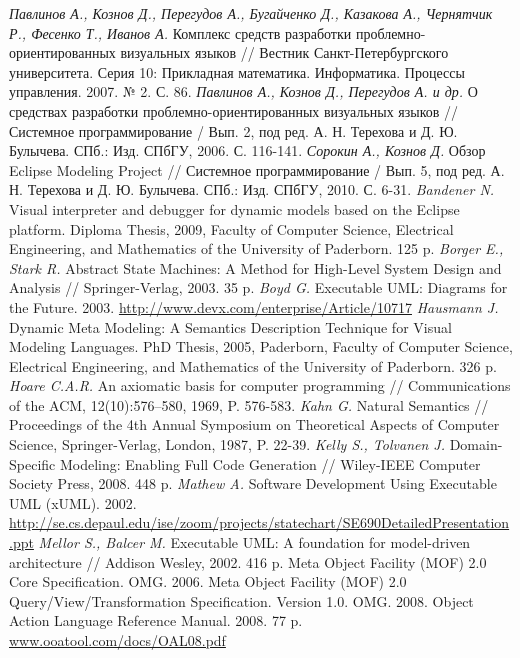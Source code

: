 \documentclass[a5paper]{article}
\begin{document}
\begin{thebibliography}{9001}
 \emph{Павлинов А., Кознов Д., Перегудов А., Бугайченко Д., Казакова А., Чернятчик Р., Фесенко Т., Иванов А.} Комплекс средств разработки проблемно-ориентированных визуальных языков // Вестник Санкт-Петербургского университета. Серия 10: Прикладная математика. Информатика. Процессы управления. 2007. № 2. С. 86.
 \emph{Павлинов А., Кознов Д., Перегудов А. и др.} О средствах разработки проблемно-ориентированных визуальных языков // Системное программирование / Вып. 2, под ред. А. Н. Терехова и Д. Ю. Булычева. СПб.: Изд. СПбГУ, 2006. С. 116-141.
 \emph{Сорокин А., Кознов Д.} Обзор Eclipse Modeling Project // Системное программирование / Вып. 5, под ред. А. Н. Терехова и Д. Ю. Булычева. СПб.: Изд. СПбГУ, 2010. С. 6-31.
 \emph{Bandener N.} Visual interpreter and debugger for dynamic models based on the Eclipse platform. Diploma Thesis, 2009, Faculty of Computer Science, Electrical Engineering, and Mathematics of the University of Paderborn. 125 p.
 \emph{Borger E., Stark R.} Abstract State Machines: A Method for High-Level System Design and Analysis // Springer-Verlag, 2003. 35 p.
 \emph{Boyd G.} Executable UML: Diagrams for the Future. 2003. \url{http://www.devx.com/enterprise/Article/10717}
 \emph{Hausmann J.} Dynamic Meta Modeling: A Semantics Description Technique for Visual Modeling Languages. PhD Thesis, 2005, Paderborn, Faculty of Computer Science, Electrical Engineering, and Mathematics of the University of Paderborn. 326 p.
 \emph{Hoare C.A.R.} An axiomatic basis for computer programming // Communications of the ACM, 12(10):576–580, 1969, P. 576-583.
 \emph{Kahn G.} Natural Semantics // Proceedings of the 4th Annual Symposium on Theoretical Aspects of Computer Science, Springer-Verlag, London, 1987, P. 22-39.
 \emph{Kelly S., Tolvanen J.} Domain-Specific Modeling: Enabling Full Code Generation // Wiley-IEEE Computer Society Press, 2008. 448 p.
 \emph{Mathew A.} Software Development Using Executable UML (xUML). 2002. \url{http://se.cs.depaul.edu/ise/zoom/projects/statechart/SE690DetailedPresentation.ppt}
 \emph{Mellor S., Balcer M.} Executable UML: A foundation for model-driven architecture // Addison Wesley, 2002. 416 p.
 Meta Object Facility (MOF) 2.0 Core Specification. OMG. 2006.
 Meta Object Facility (MOF) 2.0 Query/View/Transformation Specification. Version 1.0. OMG. 2008.
 Object Action Language Reference Manual. 2008. 77 p. \url{www.ooatool.com/docs/OAL08.pdf}

\end{thebibliography}
\end{document}
